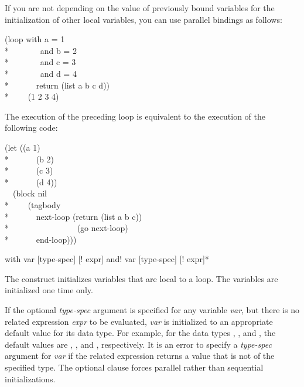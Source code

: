 \begin{new}
If you are not depending on the value of previously bound variables
for the initialization of other local variables, you can use
parallel bindings as follows:
\begin{lisp}
(loop with a = 1  \\*
~~~~~~~and b = 2  \\*
~~~~~~~and c = 3 \\*
~~~~~~~and d = 4 \\*
~~~~~~return (list a b c d)) \\*
~~~\EV~(1 2 3 4)
\end{lisp}

The execution of the preceding loop is equivalent to the execution of
the following code:

\begin{lisp}
(let ((a 1) \\*
~~~~~~(b 2) \\*
~~~~~~(c 3) \\*
~~~~~~(d 4)) \\
~~(block nil \\*
~~~~(tagbody \\*
~~~~~~next-loop (return (list a b c)) \\*
~~~~~~~~~~~~~~~~(go next-loop) \\*
~~~~~~end-loop)))
\end{lisp}

\begin{defloop}
with var [type-spec] [\!\Xequal! expr] {\!and! var [type-spec] [\!\Xequal! expr]}*

The  construct initializes variables that are local to 
a loop.  The variables are initialized one time only.

If the optional {\it type-spec\/} argument is specified for any variable 
{\it var\/}, but there is no related expression {\it expr} to be evaluated, {\it var\/}
is initialized to an appropriate default value for its data type.
For example, for the data types , , and ,
the default values are , , and , respectively.
It is an error to specify a {\it type-spec\/} argument for {\it var\/} if
the related expression returns a value that is not of the specified type.
The optional  clause forces parallel rather than sequential 
initializations.



\end{defloop}
\end{new}
